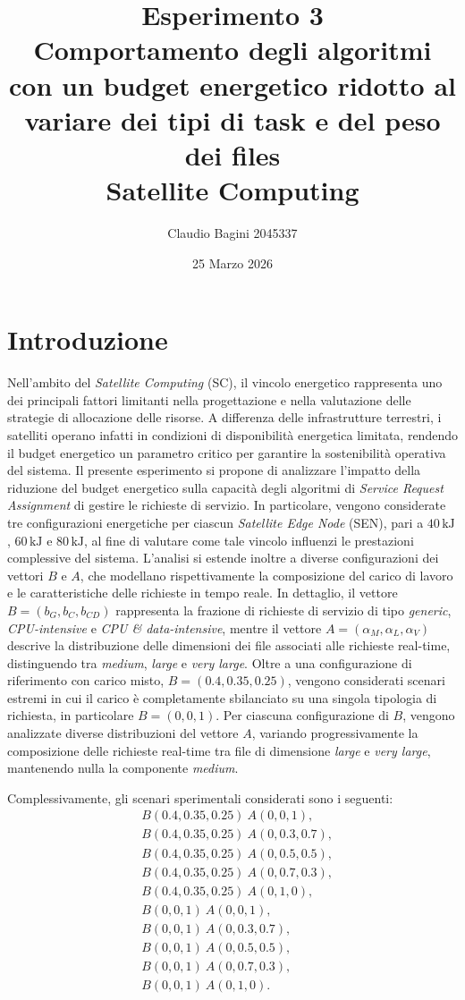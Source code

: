 \documentclass[12pt]{article}
\title{
\textbf{Esperimento 3} \\[0.5em]
\textbf{Comportamento degli algoritmi con un budget energetico ridotto al variare dei tipi di task e del peso dei files} \\[1em]
Satellite Computing
}
\author{Claudio Bagini 2045337}
\date{25 Marzo 2026}
\begin{document}
\maketitle

\section{Introduzione}
Nell’ambito del \textit{Satellite Computing} (SC), il vincolo energetico rappresenta uno dei principali fattori limitanti nella progettazione e nella valutazione delle strategie di allocazione delle risorse. A differenza delle infrastrutture terrestri, i satelliti operano infatti in condizioni di disponibilità energetica limitata, rendendo il budget energetico un parametro critico per garantire la sostenibilità operativa del sistema. Il presente esperimento si propone di analizzare l’impatto della riduzione del budget energetico sulla capacità degli algoritmi di \textit{Service Request Assignment} di gestire le richieste di servizio. In particolare, vengono considerate tre configurazioni energetiche per ciascun \textit{Satellite Edge Node} (SEN), pari a $40\,\mathrm{kJ}$, $60\,\mathrm{kJ}$ e $80\,\mathrm{kJ}$, al fine di valutare come tale vincolo influenzi le prestazioni complessive del sistema. L’analisi si estende inoltre a diverse configurazioni dei vettori $B$ e $A$, che modellano rispettivamente la composizione del carico di lavoro e le caratteristiche delle richieste in tempo reale. In dettaglio, il vettore $B = (b_G, b_C, b_{CD})$ rappresenta la frazione di richieste di servizio di tipo \textit{generic}, \textit{CPU-intensive} e \textit{CPU \& data-intensive}, mentre il vettore $A = (\alpha_M, \alpha_L, \alpha_V)$ descrive la distribuzione delle dimensioni dei file associati alle richieste real-time, distinguendo tra \textit{medium}, \textit{large} e \textit{very large}. Oltre a una configurazione di riferimento con carico misto, $B = (0.4, 0.35, 0.25)$, vengono considerati scenari estremi in cui il carico è completamente sbilanciato su una singola tipologia di richiesta, in particolare $B = (0,0,1)$. Per ciascuna configurazione di $B$, vengono analizzate diverse distribuzioni del vettore $A$, variando progressivamente la composizione delle richieste real-time tra file di dimensione \textit{large} e \textit{very large}, mantenendo nulla la componente \textit{medium}.

Complessivamente, gli scenari sperimentali considerati sono i seguenti:
\begin{align*}
& B(0.4,0.35,0.25)\ A(0,0,1), \\
& B(0.4,0.35,0.25)\ A(0,0.3,0.7), \\
& B(0.4,0.35,0.25)\ A(0,0.5,0.5), \\
& B(0.4,0.35,0.25)\ A(0,0.7,0.3), \\
& B(0.4,0.35,0.25)\ A(0,1,0), \\
& B(0,0,1)\ A(0,0,1), \\
& B(0,0,1)\ A(0,0.3,0.7), \\
& B(0,0,1)\ A(0,0.5,0.5), \\
& B(0,0,1)\ A(0,0.7,0.3), \\
& B(0,0,1)\ A(0,1,0).
\end{align*}
\end{document}

